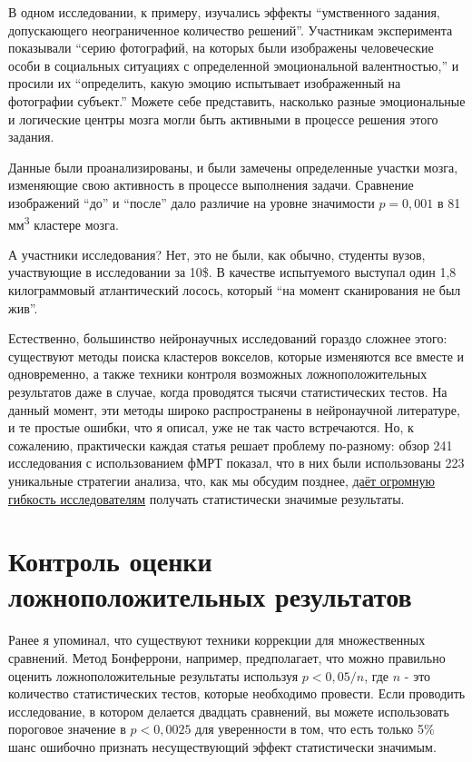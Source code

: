 В одном исследовании, к примеру, изучались эффекты ``умственного задания, допускающего неограниченное количество решений''. Участникам эксперимента показывали ``серию фотографий, на которых были изображены человеческие особи в социальных ситуациях с определенной эмоциональной валентностью,'' и просили их ``определить, какую эмоцию испытывает изображенный на фотографии субъект.'' Можете себе представить, насколько разные эмоциональные и логические центры мозга могли быть активными в процессе решения этого задания.   

Данные были проанализированы, и были замечены определенные участки мозга, изменяющие свою активность в процессе выполнения задачи. Сравнение изображений ``до'' и ``после'' дало различие на уровне значимости $p = 0, 001$ в 81 мм\textsuperscript{3} кластере мозга.

А участники исследования? Нет, это не были, как обычно, студенты вузов, участвующие в исследовании за 10\$. В качестве испытуемого выступал один 1,8 килограммовый атлантический лосось, который ``на момент сканирования не был жив''. \cite{bennett_neural_2009}  

Естественно, большинство нейронаучных исследований гораздо сложнее этого: существуют методы поиска кластеров вокселов, которые изменяются все вместе и одновременно, а также техники контроля возможных ложноположительных результатов даже в случае, когда проводятся тысячи статистических тестов. На данный момент, эти методы широко распространены в нейронаучной литературе, и те простые ошибки, что я описал, уже не так часто встречаются. Но, к сожалению, практически каждая статья решает проблему по-разному: обзор 241 исследования с использованием фМРТ показал, что в них были использованы 223 уникальные стратегии анализа, что, как мы обсудим позднее, \hyperref[chp8]{даёт огромную гибкость исследователям} получать статистически значимые результаты.\cite{carp_secret_2012}  


\section{Контроль оценки ложноположительных результатов}
\label{chp5:controlfalserate}

Ранее я упоминал, что существуют техники коррекции для множественных сравнений. Метод Бонферрони, например, предполагает, что можно правильно оценить ложноположительные результаты используя $p < 0,05/ n$, где $n$ - это количество статистических тестов, которые необходимо провести. Если проводить исследование, в котором делается двадцать сравнений, вы можете использовать пороговое значение в $p < 0,0025$ для уверенности в том, что есть только 5\% шанс ошибочно признать несуществующий эффект статистически значимым.

